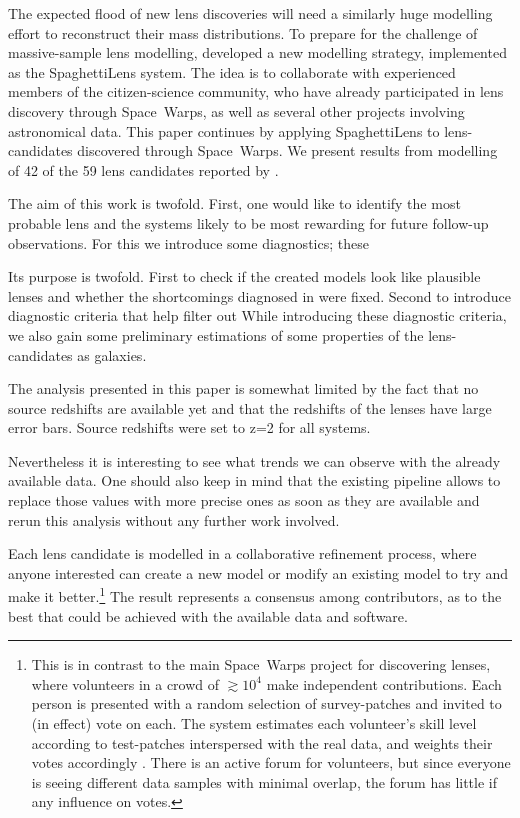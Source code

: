 The expected flood of new lens discoveries will need a similarly huge
modelling effort to reconstruct their mass distributions.  To prepare
for the challenge of massive-sample lens modelling,
\cite{2015MNRAS.447.2170K} developed a new modelling strategy,
implemented as the SpaghettiLens system.  The idea is to collaborate
with experienced members of the citizen-science community, who have
already participated in lens discovery through Space~Warps, as well as
several other projects involving astronomical data.  This paper
continues by applying SpaghettiLens to lens-candidates discovered
through Space~Warps.  We present results from modelling of 42 of the
59 lens candidates reported by \cite{2016MNRAS.455.1191M}.

The aim of this work is twofold.  First, one would like to identify
the most probable lens and the systems likely to be most rewarding for
future follow-up observations.  For this we introduce some
diagnostics; these

  Its purpose is twofold.  First to check if the
created models look like plausible lenses and whether the shortcomings
diagnosed in \cite{2015MNRAS.447.2170K} were fixed.  Second to
introduce diagnostic criteria that help filter out   While introducing these diagnostic criteria, we also
gain some preliminary estimations of some properties of the
lens-candidates as galaxies.


The analysis presented in this paper is somewhat limited by the fact that no source redshifts are available yet and that the redshifts of the lenses have large error bars.
Source redshifts were set to z=2 for all systems. %

Nevertheless it is interesting to see what trends we can observe with the already available data.
One should also keep in mind that the existing pipeline allows to replace those values with more precise ones as soon as they are available and rerun this analysis without any further work involved.


Each lens candidate is modelled in a collaborative refinement
process, where anyone interested can create a new model or modify an
existing model to try and make it better.\footnote{This is in contrast
  to the main Space~Warps project for discovering lenses, where
  volunteers in a crowd of $\gtrsim10^4$ make independent
  contributions.  Each person is presented with a random selection of
  survey-patches and invited to (in effect) vote on each.  The system
  estimates each volunteer's skill level according to test-patches
  interspersed with the real data, and weights their votes accordingly
  \citep{2016MNRAS.455.1171M}.  There is an active forum for
  volunteers, but since everyone is seeing different data samples with
  minimal overlap, the forum has little if any influence on votes.}
The result represents a consensus among contributors, as to the best
that could be achieved with the available data and software.


